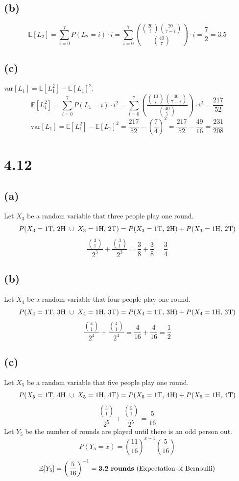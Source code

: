 \documentclass[11pt]{article}
\begin{document}
\subsection*{(b)}
\[\mathbb{E}[L_2]=\sum_{i=0}^7P(L_2=i)\cdot i=\sum_{i=0}^7\left(\frac{\binom{20}{i}\binom{20}{7-i}}{\binom{40}{7}}\right)\cdot i=\frac{7}{2}=3.5\]
\subsection*{(c)}
var$[L_1]=\mathbb{E}[L_1^2]-\mathbb{E}[L_1]^2$.
\[\mathbb{E}[L_1^2]=\sum_{i=0}^7P(L_1=i)\cdot i^2=\sum_{i=0}^7\left(\frac{\binom{10}{i}\binom{30}{7-i}}{\binom{40}{7}}\right)\cdot i^2=\frac{217}{52}\]
\[\text{var}[L_1]=\mathbb{E}[L_1^2]-\mathbb{E}[L_1]^2=\frac{217}{52}-\left(\frac{7}{4}\right)^2=\frac{217}{52}-\frac{49}{16}=\frac{231}{208}\]

\section*{4.12}
\subsection*{(a)}
Let $X_3$ be a random variable that three people play one round.
\[P(X_3=\text{1T, 2H }\cup\hspace{1mm}X_3=\text{1H, 2T})=P(X_3=\text{1T, 2H})+P(X_3=\text{1H, 2T})\]
\[\frac{\binom{3}{1}}{2^3}+\frac{\binom{3}{1}}{2^3}=\frac{3}{8}+\frac{3}{8}=\frac{3}{4}\]
\subsection*{(b)}
Let $X_4$ be a random variable that four people play one round.
\[P(X_4=\text{1T, 3H }\cup\hspace{1mm}X_4=\text{1H, 3T})=P(X_4=\text{1T, 3H})+P(X_4=\text{1H, 3T})\]
\[\frac{\binom{4}{1}}{2^4}+\frac{\binom{4}{1}}{2^4}=\frac{4}{16}+\frac{4}{16}=\frac{1}{2}\]
\subsection*{(c)}
Let $X_5$ be a random variable that five people play one round.
\[P(X_5=\text{1T, 4H }\cup\hspace{1mm}X_5=\text{1H, 4T})=P(X_5=\text{1T, 4H})+P(X_5=\text{1H, 4T})\]
\[\frac{\binom{5}{1}}{2^5}+\frac{\binom{5}{1}}{2^5}=\frac{5}{16}\]
Let $Y_5$ be the number of rounds are played until there is an odd person out.
\[P(Y_5=x)=\left(\frac{11}{16}\right)^{x-1}\left(\frac{5}{16}\right)\]
\[\mathbb{E}[Y_5]=\left(\frac{5}{16}\right)^{-1}=\textbf{3.2}\text{ \textbf{rounds} (Expectation of Bernoulli)}\]
\end{document}

